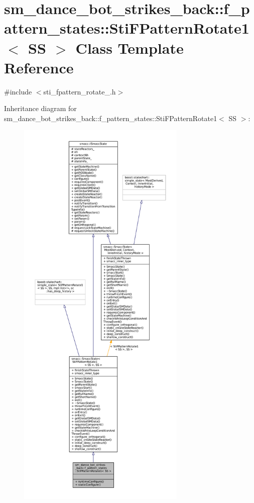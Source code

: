 \hypertarget{structsm__dance__bot__strikes__back_1_1f__pattern__states_1_1StiFPatternRotate1}{}\section{sm\+\_\+dance\+\_\+bot\+\_\+strikes\+\_\+back\+:\+:f\+\_\+pattern\+\_\+states\+:\+:Sti\+F\+Pattern\+Rotate1$<$ SS $>$ Class Template Reference}
\label{structsm__dance__bot__strikes__back_1_1f__pattern__states_1_1StiFPatternRotate1}


{\ttfamily \#include $<$sti\+\_\+fpattern\+\_\+rotate\+\_.\+h$>$}



Inheritance diagram for sm\+\_\+dance\+\_\+bot\+\_\+strikes\+\_\+back\+:\+:f\+\_\+pattern\+\_\+states\+:\+:Sti\+F\+Pattern\+Rotate1$<$ SS $>$\+:
\nopagebreak
\begin{figure}[H]
\begin{center}
\leavevmode
\includegraphics[height=550pt]{structsm__dance__bot__strikes__back_1_1f__pattern__states_1_1StiFPatternRotate1__inherit__graph}
\end{center}
\end{figure}


